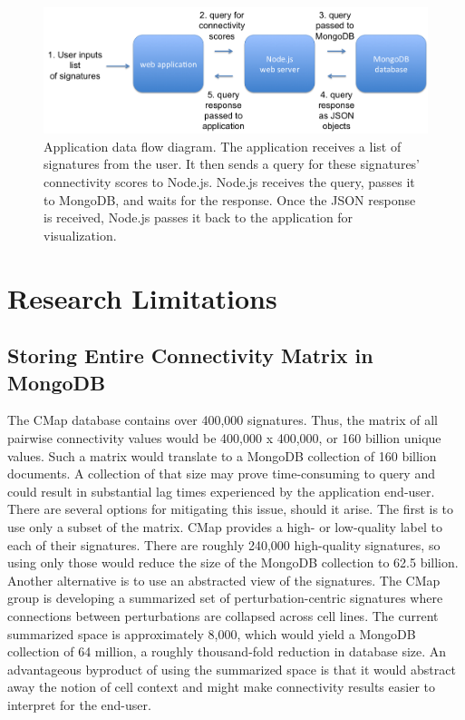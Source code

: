 \documentclass[12pt]{article}
\begin{document}
\begin{figure}[h]
\centering
\includegraphics[scale=0.5]{img/app_data_flow.png}
\caption{ Application data flow diagram. The application receives a list of signatures from the user. It then sends a query for these signatures' connectivity scores to Node.js. Node.js receives the query, passes it to MongoDB, and waits for the response. Once the JSON response is received, Node.js passes it back to the application for visualization.}
\label{fig:app_data_flow}
\end{figure}

\section{Research Limitations}
\subsection{Storing Entire Connectivity Matrix in MongoDB}

The CMap database contains over 400,000 signatures. Thus, the matrix of all pairwise connectivity values would be 400,000 x 400,000, or 160 billion unique values. Such a matrix would translate to a MongoDB collection of 160 billion documents. A collection of that size may prove time-consuming to query and could result in substantial lag times experienced by the application end-user. There are several options for mitigating this issue, should it arise. The first is to use only a subset of the matrix. CMap provides a high- or low-quality label to each of their signatures. There are roughly 240,000 high-quality signatures, so using only those would reduce the size of the MongoDB collection to 62.5 billion. Another alternative is to use an abstracted view of the signatures. The CMap group is developing a summarized set of perturbation-centric signatures where connections between perturbations are collapsed across cell lines. The current summarized space is approximately 8,000, which would yield a MongoDB collection of 64 million, a roughly thousand-fold reduction in database size. An advantageous byproduct of using the summarized space is that it would abstract away the notion of cell context and might make connectivity results easier to interpret for the end-user.
\end{document}
